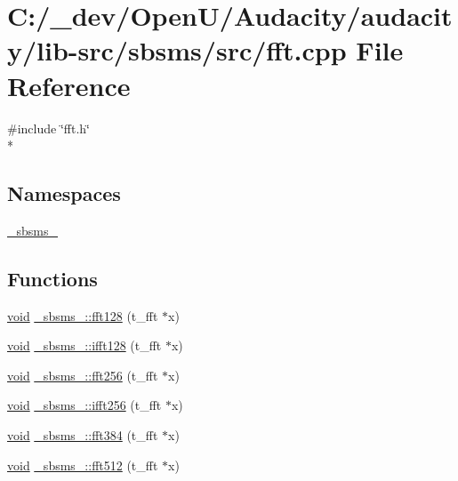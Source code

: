 \hypertarget{lib-src_2sbsms_2src_2_f_f_t_8cpp}{}\section{C\+:/\+\_\+dev/\+Open\+U/\+Audacity/audacity/lib-\/src/sbsms/src/fft.cpp File Reference}
\label{lib-src_2sbsms_2src_2_f_f_t_8cpp}
{\ttfamily \#include \char`\"{}fft.\+h\char`\"{}}\\*
\subsection*{Namespaces}
\begin{DoxyCompactItemize}
\item 
 \hyperlink{namespace__sbsms__}{\+\_\+sbsms\+\_\+}
\end{DoxyCompactItemize}
\subsection*{Functions}
\begin{DoxyCompactItemize}
\item 
\hyperlink{sound_8c_ae35f5844602719cf66324f4de2a658b3}{void} \hyperlink{namespace__sbsms___aa6ea31b4c826b4574dfea9a4eb1ec265}{\+\_\+sbsms\+\_\+\+::fft128} (t\+\_\+fft $\ast$x)
\item 
\hyperlink{sound_8c_ae35f5844602719cf66324f4de2a658b3}{void} \hyperlink{namespace__sbsms___ab395b21a80ba2e3d1f5fcd12246822b5}{\+\_\+sbsms\+\_\+\+::ifft128} (t\+\_\+fft $\ast$x)
\item 
\hyperlink{sound_8c_ae35f5844602719cf66324f4de2a658b3}{void} \hyperlink{namespace__sbsms___aa82e7ecc999460d37f4067f5006cf751}{\+\_\+sbsms\+\_\+\+::fft256} (t\+\_\+fft $\ast$x)
\item 
\hyperlink{sound_8c_ae35f5844602719cf66324f4de2a658b3}{void} \hyperlink{namespace__sbsms___a72b2381d65e7f263db213e90894e30cf}{\+\_\+sbsms\+\_\+\+::ifft256} (t\+\_\+fft $\ast$x)
\item 
\hyperlink{sound_8c_ae35f5844602719cf66324f4de2a658b3}{void} \hyperlink{namespace__sbsms___a8d7baf7d22bb83ebbdfdeac0fec7b155}{\+\_\+sbsms\+\_\+\+::fft384} (t\+\_\+fft $\ast$x)
\item 
\hyperlink{sound_8c_ae35f5844602719cf66324f4de2a658b3}{void} \hyperlink{namespace__sbsms___ac18b1d66c6570f5c7d3347bbc21e2bd3}{\+\_\+sbsms\+\_\+\+::fft512} (t\+\_\+fft $\ast$x)
\end{DoxyCompactItemize}
